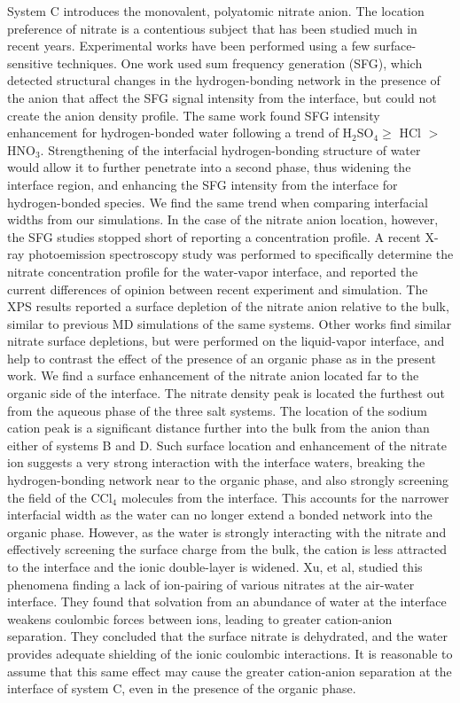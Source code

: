 System C introduces the monovalent, polyatomic nitrate anion. The location preference of nitrate is a contentious subject that has been studied much in recent years. Experimental works have been performed using a few surface-sensitive techniques. One work used sum frequency generation (SFG), which detected structural changes in the hydrogen-bonding network in the presence of the anion that affect the SFG signal intensity from the interface, but could not create the anion density profile\cite{Schnitzer2000}. The same work found SFG intensity enhancement for hydrogen-bonded water following a trend of H$_2$SO$_4\ge$ HCl $>$ HNO$_3$. Strengthening of the interfacial hydrogen-bonding structure of water would allow it to further penetrate into a second phase, thus widening the interface region, and enhancing the SFG intensity from the interface for hydrogen-bonded species. We find the same trend when comparing interfacial widths from our simulations. In the case of the nitrate anion location, however, the SFG studies stopped short of reporting a concentration profile. A recent X-ray photoemission spectroscopy study was performed to specifically determine the nitrate concentration profile for the water-vapor interface, and reported the current differences of opinion between recent experiment and simulation.\cite{Brown2009} The XPS results reported a surface depletion of the nitrate anion relative to the bulk, similar to previous MD simulations of the same systems. Other works find similar nitrate surface depletions,\cite{Otten2007} but were performed on the liquid-vapor interface, and help to contrast the effect of the presence of an organic phase as in the present work. We find a surface enhancement of the nitrate anion located far to the organic side of the interface. The nitrate density peak is located the furthest out from the aqueous phase of the three salt systems. The location of the sodium cation peak is a significant distance further into the bulk from the anion than either of systems B and D. Such surface location and enhancement of the nitrate ion suggests a very strong interaction with the interface waters, breaking the hydrogen-bonding network near to the organic phase, and also strongly screening the field of the CCl$_4$ molecules from the interface. This accounts for the narrower interfacial width as the water can no longer extend a bonded network into the organic phase. However, as the water is strongly interacting with the nitrate and effectively screening the surface charge from the bulk, the cation is less attracted to the interface and the ionic double-layer is widened. Xu, et al, studied this phenomena finding a lack of ion-pairing of various nitrates at the air-water interface.\cite{Xu2009} They found that solvation from an abundance of water at the interface weakens coulombic forces between ions, leading to greater cation-anion separation. They concluded that the surface nitrate is dehydrated, and the water provides adequate shielding of the ionic coulombic interactions. It is reasonable to assume that this same effect may cause the greater cation-anion separation at the interface of system C, even in the presence of the organic phase.

